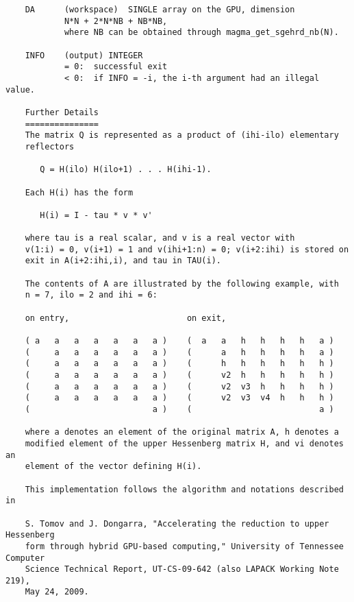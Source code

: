 \documentclass[10pt]{book}
\begin{document}
\begin{verbatim}
    DA      (workspace)  SINGLE array on the GPU, dimension
            N*N + 2*N*NB + NB*NB,
            where NB can be obtained through magma_get_sgehrd_nb(N).

    INFO    (output) INTEGER
            = 0:  successful exit
            < 0:  if INFO = -i, the i-th argument had an illegal value.

    Further Details
    ===============
    The matrix Q is represented as a product of (ihi-ilo) elementary
    reflectors

       Q = H(ilo) H(ilo+1) . . . H(ihi-1).

    Each H(i) has the form

       H(i) = I - tau * v * v'

    where tau is a real scalar, and v is a real vector with
    v(1:i) = 0, v(i+1) = 1 and v(ihi+1:n) = 0; v(i+2:ihi) is stored on
    exit in A(i+2:ihi,i), and tau in TAU(i).

    The contents of A are illustrated by the following example, with
    n = 7, ilo = 2 and ihi = 6:

    on entry,                        on exit,

    ( a   a   a   a   a   a   a )    (  a   a   h   h   h   h   a )
    (     a   a   a   a   a   a )    (      a   h   h   h   h   a )
    (     a   a   a   a   a   a )    (      h   h   h   h   h   h )
    (     a   a   a   a   a   a )    (      v2  h   h   h   h   h )
    (     a   a   a   a   a   a )    (      v2  v3  h   h   h   h )
    (     a   a   a   a   a   a )    (      v2  v3  v4  h   h   h )
    (                         a )    (                          a )

    where a denotes an element of the original matrix A, h denotes a
    modified element of the upper Hessenberg matrix H, and vi denotes an
    element of the vector defining H(i).

    This implementation follows the algorithm and notations described in

    S. Tomov and J. Dongarra, "Accelerating the reduction to upper Hessenberg
    form through hybrid GPU-based computing," University of Tennessee Computer
    Science Technical Report, UT-CS-09-642 (also LAPACK Working Note 219),
    May 24, 2009.
\end{verbatim}

\newpage
\end{document}
